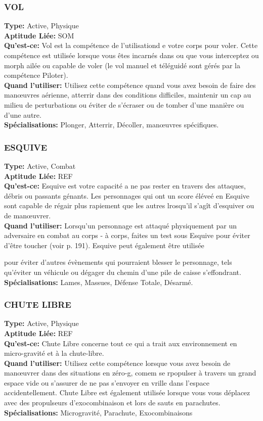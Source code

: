 \subsubsection{VOL} \textbf{Type:} Active, Physique\\ \textbf{Aptitude Liée:} SOM \\ \textbf{Qu'est-ce:} Vol est la compétence de l'utilisationd e votre corps pour voler. Cette compétence est utilisée lorsque vous êtes incarnés dans ou que vous interceptez ou morph ailée ou capable de voler (le vol manuel et téléguidé sont gérés par la compétence Piloter). \\ \textbf{Quand l'utiliser:} Utilisez cette compétence quand vous avez besoin de faire des manœuvres aérienne, atterrir dans des conditions difficiles, maintenir un cap au milieu de perturbations ou éviter de s'écraser ou de tomber d'une manière ou d'une autre. \\ \textbf{Spécialisations:} Plonger, Atterrir, Décoller, manœuvres spécifiques. 

\subsubsection{ESQUIVE} \textbf{Type:} Active, Combat \\ \textbf{Aptitude Liée:} REF \\ \textbf{Qu'est-ce:} Esquive est votre capacité a ne pas rester en travers des attaques, débris ou passants génants. Les personnages qui ont un score éléveé en Esquive sont capable de régair plus rapiement que les autres lrosqu'il s'agît d'esquiver ou de manœuvrer. \\ \textbf{Quand l'utiliser: } Lorsqu'un personnage est attaqué physiquement par un adversaire en combat au corps - à corps, faites un test sous Esquive pour éviter d'être toucher (voir p. 191). Esquive peut également être utilisée 

pour éviter d'autres évènements qui pourraient blesser le personnage, tels qu'éviter un véhicule ou dégager du chemin d'une pile de caisse s'effondrant. \\ \textbf{Spécialisations:} Lames, Massues, Défense Totale, Désarmé. 

\subsubsection{CHUTE LIBRE} \textbf{Type:} Active, Physique\\ \textbf{Aptitude Liée:} REF \\ \textbf{Qu'est-ce:} Chute Libre concerne tout ce qui a trait aux environnement en micro-gravité et à la chute-libre. \\ \textbf{Quand l'utiliser:} Utilisez cette compétence lorsque vous avez besoin de manœuvrer dans des situations en zéro-g, comem se rpopulser à travers un grand espace vide ou s'assurer de ne pas s'envoyer en vrille dans l'espace accidentellement. Chute Libre est également utilisée lorsque vous vous déplacez avec des propulseurs d'exocombinaison et lors de sauts en parachutes. \\ \textbf{Spécialisations:} Microgravité, Parachute, Exocombinaisons 

